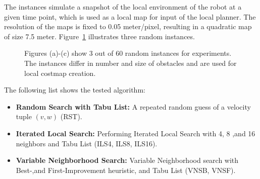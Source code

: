 The instances simulate a snapshot of the local environment of the robot at a given time point, which is used as a local map for input of the local planner.
The resolution of the maps is fixed to 0.05 meter/pixel, resulting in a quadratic map of size 7.5 meter. Figure~\ref{fig:fig_instances} illustrates three random instances. 
\begin{figure}[thpb]
     \footnotesize
      \centering
      \myfloatalign
      \setlength\fboxsep{0pt}
      \setlength\fboxrule{0.5pt}
       \caption{Figures (a)-(c) show 3 out of 60 random instances for experiments. The instances differ in number and size of obstacles and are used for local costmap creation.}
      \label{fig:fig_instances}
   \end{figure}

The following list shows the tested algorithm:
\begin{itemize}
\item{\bf{Random Search with Tabu List:}} A repeated random guess of a velocity tuple $(v,w)$ (RST).
\item{\bf{Iterated Local Search:}} Performing Iterated Local Search with 4, 8 ,and 16 neighbors and Tabu List (ILS4, ILS8, ILS16).
\item{\bf{Variable Neighborhood Search:}} Variable Neighborhood search with Best-,and First-Improvement heuristic, and Tabu List (VNSB, VNSF).
\end{itemize}

